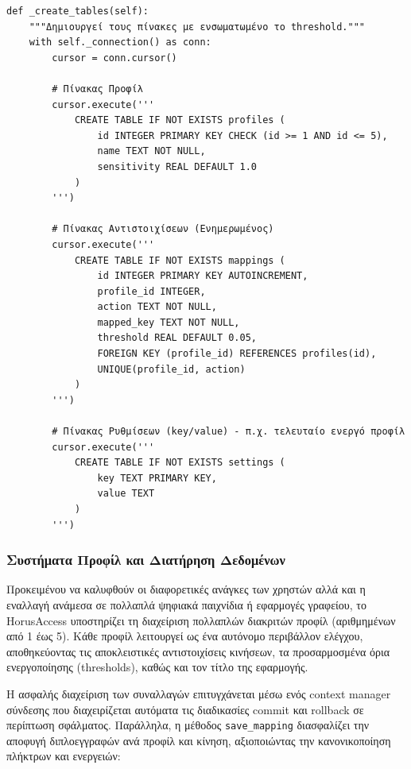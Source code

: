 \documentclass[twoside, a4paper, 11pt]{article}
\newcommand{\textlatin}[1]{\textenglish{#1}}
\begin{document}
\begin{verbatim}
def _create_tables(self):
    """Δημιουργεί τους πίνακες με ενσωματωμένο το threshold."""
    with self._connection() as conn:
        cursor = conn.cursor()
        
        # Πίνακας Προφίλ
        cursor.execute('''
            CREATE TABLE IF NOT EXISTS profiles (
                id INTEGER PRIMARY KEY CHECK (id >= 1 AND id <= 5),
                name TEXT NOT NULL,
                sensitivity REAL DEFAULT 1.0
            )
        ''')
        
        # Πίνακας Αντιστοιχίσεων (Ενημερωμένος)
        cursor.execute('''
            CREATE TABLE IF NOT EXISTS mappings (
                id INTEGER PRIMARY KEY AUTOINCREMENT,
                profile_id INTEGER,
                action TEXT NOT NULL,
                mapped_key TEXT NOT NULL,
                threshold REAL DEFAULT 0.05,
                FOREIGN KEY (profile_id) REFERENCES profiles(id),
                UNIQUE(profile_id, action)
            )
        ''')

        # Πίνακας Ρυθμίσεων (key/value) - π.χ. τελευταίο ενεργό προφίλ
        cursor.execute('''
            CREATE TABLE IF NOT EXISTS settings (
                key TEXT PRIMARY KEY,
                value TEXT
            )
        ''')
\end{verbatim}

\subsubsection{Συστήματα Προφίλ και Διατήρηση Δεδομένων}
Προκειμένου να καλυφθούν οι διαφορετικές ανάγκες των χρηστών αλλά και η εναλλαγή ανάμεσα σε πολλαπλά ψηφιακά παιχνίδια ή εφαρμογές γραφείου, το \textlatin{HorusAccess} υποστηρίζει τη διαχείριση πολλαπλών διακριτών προφίλ (αριθμημένων από 1 έως 5). Κάθε προφίλ λειτουργεί ως ένα αυτόνομο περιβάλλον ελέγχου, αποθηκεύοντας τις αποκλειστικές αντιστοιχίσεις κινήσεων, τα προσαρμοσμένα όρια ενεργοποίησης (\textlatin{thresholds}), καθώς και τον τίτλο της εφαρμογής.

Η ασφαλής διαχείριση των συναλλαγών επιτυγχάνεται μέσω ενός \textlatin{context manager} σύνδεσης που διαχειρίζεται αυτόματα τις διαδικασίες \textlatin{commit} και \textlatin{rollback} σε περίπτωση σφάλματος. Παράλληλα, η μέθοδος \texttt{save\_mapping} διασφαλίζει την αποφυγή διπλοεγγραφών ανά προφίλ και κίνηση, αξιοποιώντας την κανονικοποίηση πλήκτρων και ενεργειών:
\end{document}
